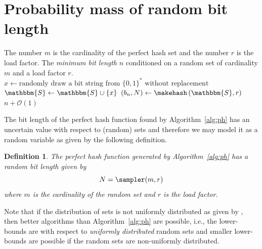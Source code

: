 \documentclass[hidelinks,11pt,final]{article}
\newcommand{\envnumstyle}{section}
\theoremstyle{plain}
\newtheorem{definition}{Definition}[\envnumstyle]
\begin{document}

\appendix
\appendixpage
\addappheadtotoc
\section{Probability mass of random bit length}
\begin{algorithm}
    \caption{Bit length sampler of the cryptographic perfect hash function}
    \label{alg:sampler}
    \KwIn
    {
        The number $m$ is the cardinality of the perfect hash set and
        the number $r$ is the load factor.
    }
    \KwOut
    {
        The \emph{minimum bit length} $n$ conditioned on a random set of cardinality $m$ and a load factor $r$.
    }
    {
        {
            $x \gets \text{randomly draw a bit string from $\{0,1\}^{*}$ without replacement}$\;
            $\mathbbm{S} \gets \mathbbm{S} \cup \{x\}$\;
        }    
        $(b_n,N) \gets \makehash\left(\mathbbm{S}, r\right)$\;
        \Return $n + \mathcal{O}(1)$\;
    }
\end{algorithm}
The bit length of the perfect hash function found by Algorithm~\ref{alg:ph} has an uncertain value with respect to (random) sets and therefore we may model it as a random variable as given by the following definition.
\begin{definition}
\label{def:N_rv}
The perfect hash function generated by Algorithm~\ref{alg:ph} has a random bit length given by
\begin{equation}
    N = \sampler(m,r)
\end{equation}
where $m$ is the cardinality of the random set and $r$ is the load factor.
\end{definition}
Note that if the distribution of sets is not uniformly distributed as given by 
\sampler, then better algorithms than Algorithm~\ref{alg:ph} are possible, i.e., the 
lower-bounds are with respect to \emph{uniformly distributed}
random sets and smaller lower-bounds are possible if the random sets are 
non-uniformly distributed.
\end{document}
